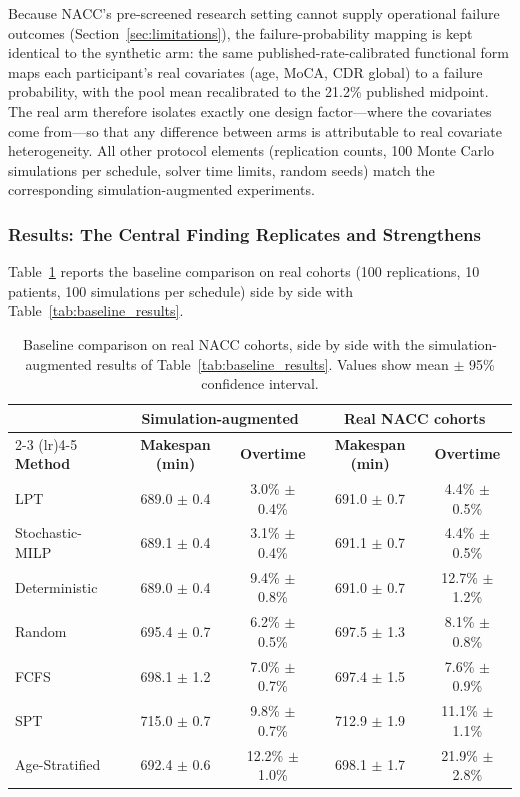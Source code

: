 \documentclass[11pt,a4paper]{article}
\begin{document}
{Because NACC's pre-screened research setting cannot supply operational failure outcomes (Section~\ref{sec:limitations}), the failure-probability mapping is kept identical to the synthetic arm: the same published-rate-calibrated functional form maps each participant's real covariates (age, MoCA, CDR global) to a failure probability, with the pool mean recalibrated to the 21.2\% published midpoint. The real arm therefore isolates exactly one design factor---where the covariates come from---so that any difference between arms is attributable to real covariate heterogeneity. All other protocol elements (replication counts, 100 Monte Carlo simulations per schedule, solver time limits, random seeds) match the corresponding simulation-augmented experiments.

\subsubsection{Results: The Central Finding Replicates and Strengthens}

Table~\ref{tab:real_baseline} reports the baseline comparison on real cohorts (100 replications, 10 patients, 100 simulations per schedule) side by side with Table~\ref{tab:baseline_results}.

\begin{table}[H]
\centering
\color{red}
\caption{Baseline comparison on real NACC cohorts, side by side with the simulation-augmented results of Table~\ref{tab:baseline_results}. Values show mean $\pm$ 95\% confidence interval.}
\label{tab:real_baseline}
\begin{tabular}{@{}lcccc@{}}
\toprule
& \multicolumn{2}{c}{\textbf{Simulation-augmented}} & \multicolumn{2}{c}{\textbf{Real NACC cohorts}} \\
\cmidrule(lr){2-3} \cmidrule(lr){4-5}
\textbf{Method} & \textbf{Makespan (min)} & \textbf{Overtime} & \textbf{Makespan (min)} & \textbf{Overtime} \\
\midrule
LPT & 689.0 $\pm$ 0.4 & 3.0\% $\pm$ 0.4\% & 691.0 $\pm$ 0.7 & 4.4\% $\pm$ 0.5\% \\
Stochastic-MILP & 689.1 $\pm$ 0.4 & 3.1\% $\pm$ 0.4\% & 691.1 $\pm$ 0.7 & 4.4\% $\pm$ 0.5\% \\
Deterministic & 689.0 $\pm$ 0.4 & 9.4\% $\pm$ 0.8\% & 691.0 $\pm$ 0.7 & 12.7\% $\pm$ 1.2\% \\
Random & 695.4 $\pm$ 0.7 & 6.2\% $\pm$ 0.5\% & 697.5 $\pm$ 1.3 & 8.1\% $\pm$ 0.8\% \\
FCFS & 698.1 $\pm$ 1.2 & 7.0\% $\pm$ 0.7\% & 697.4 $\pm$ 1.5 & 7.6\% $\pm$ 0.9\% \\
SPT & 715.0 $\pm$ 0.7 & 9.8\% $\pm$ 0.7\% & 712.9 $\pm$ 1.9 & 11.1\% $\pm$ 1.1\% \\
Age-Stratified & 692.4 $\pm$ 0.6 & 12.2\% $\pm$ 1.0\% & 698.1 $\pm$ 1.7 & 21.9\% $\pm$ 2.8\% \\
\bottomrule
\end{tabular}
\end{table}

}
\end{document}
